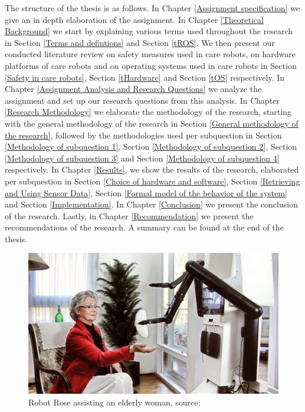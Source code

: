\documentclass[12pt]{scrreprt}
\begin{document}
The structure of the thesis is as follows. In Chapter \ref{Assignment specification} we give an in depth elaboration of the assignment. In Chapter \ref{Theoretical Background} we start by explaining various terms used throughout the research in Section \ref{Terms and defintions} and Section \ref{tROS}. We then present our conducted literature review on safety measures used in care robots, on hardware platforms of care robots and on operating systems used in care robots in Section \ref{Safety in care robots}, Section \ref{tHardware} and Section \ref{tOS} respectively. In Chapter \ref{Assignment Analysis and Research Questions} we analyze the assignment and set up our research questions from this analysis. In Chapter \ref{Research Methodology} we elaborate the methodology of the research, starting with the general methodology of the research in Section \ref{General methodology of the research}, followed by the methodologies used per subquestion in Section \ref{Methodology of subquestion 1}, Section \ref{Methodology of subquestion 2}, Section \ref{Methodology of subquestion 3} and Section \ref{Methodology of subquestion 4} respectively. In Chapter \ref{Results}, we show the results of the research, elaborated per subquestion in Section \ref{Choice of hardware and software}, Section \ref{Retrieving and Using Sensor Data}, Section \ref{Formal model of the behavior of the system} and Section \ref{Implementation}. In Chapter \ref{Conclusion} we present the conclusion of the research. Lastly, in Chapter \ref{Recommendation} we present the recommendations of the research. A summary can be found at the end of the thesis.
 
\begin{figure}[H]
    \centering
    \includegraphics[width=\textwidth]{Figures/assisting_the_elderly.jpg}
    \caption{Robot Rose assisting an elderly woman, source: \cite{rose_specification}}
    \label{fig:assiting_the_elderly}
\end{figure}
\end{document}
